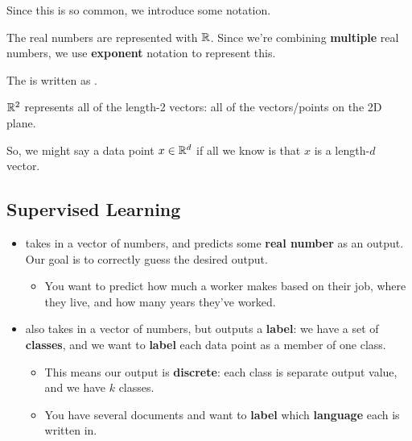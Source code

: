             
            
            Since this is so common, we introduce some notation.
            
            The real numbers are represented with $\mathbb R$. Since we're combining \textbf{multiple} real numbers, we use \textbf{exponent} notation to represent this.\\
            
            \begin{notation}
                The  is written as .
            \end{notation}
            
            \miniex $\mathbb R^2$ represents all of the length-2 vectors: all of the vectors/points on the 2D plane.
            
            So, we might say a data point $x \in \mathbb R^d$ if all we know is that $x$ is a length-$d$ vector.
    
    \subsection{Supervised Learning}
    
        \begin{itemize}
            \item {} takes in a vector of numbers, and predicts some \textbf{real number} as an output. Our goal is to correctly guess the desired output.
                \begin{itemize}
                    \item \miniex You want to predict how much a worker makes based on their job, where they live, and how many years they've worked. 
                \end{itemize}
            
            \item {} also takes in a vector of numbers, but outputs a \textbf{label}: we have a set of \textbf{classes}, and we want to \textbf{label} each data point as a member of one class. 
                \begin{itemize}
                    \item This means our output is \textbf{discrete}: each class is separate output value, and we have $k$ classes.
                    \item \miniex You have several documents and want to \textbf{label} which \textbf{language} each is written in.
                \end{itemize}
        \end{itemize}
        
